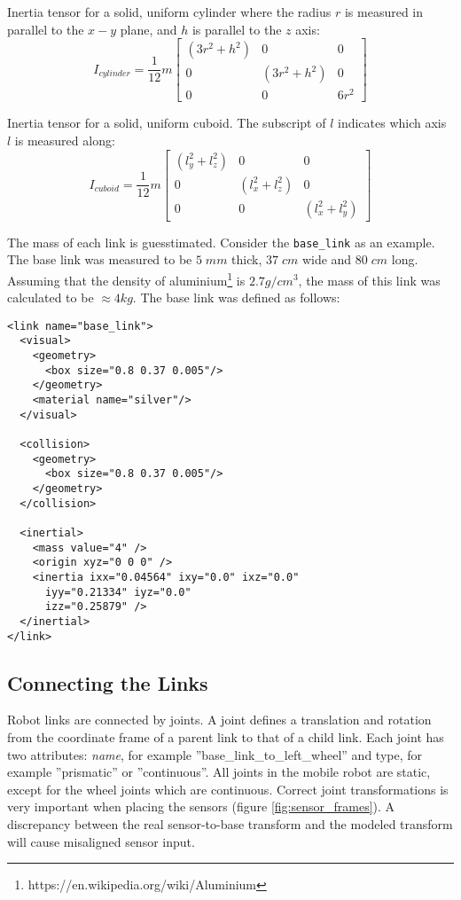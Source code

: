 Inertia tensor for a solid, uniform cylinder where the radius $r$ is measured in parallel to the $x - y$ plane, and $h$ is parallel to the $z$ axis:
\begin{equation}
I_{cylinder} = \frac{1}{12}m \begin{bmatrix}
	(3 r^2 + h^2) & 0 & 0 \\[0.3em]
	0 & (3 r^2 + h^2) & 0 \\[0.3em]
	0 & 0 & 6r^2
	\end{bmatrix}
	\label{eq:cylinder}
\end{equation}

Inertia tensor for a solid, uniform cuboid. The subscript of $l$ indicates which axis $l$ is measured along:
\begin{equation}
I_{cuboid} = \frac{1}{12}m \begin{bmatrix}
	(l_y^2 + l_z^2) & 0 & 0 \\[0.3em]
	0 & (l_x^2 + l_z^2) & 0 \\[0.3em]
	0 & 0 & (l_x^2 + l_y^2)
\end{bmatrix}
\label{eq:cuboid}
\end{equation}

The mass of each link is guesstimated. Consider the \texttt{base\_link} as an example. The base link was measured to be $5 \; mm$ thick, $37 \; cm$ wide and $80 \; cm$ long. Assuming that the density of aluminium\footnote{https://en.wikipedia.org/wiki/Aluminium} is $2.7 g/cm^3$, the mass of this link was calculated to be $\approx 4 kg$. The base link was defined as follows:

\lstset{language=XML}
\begin{lstlisting}
<link name="base_link">
  <visual>
    <geometry>
      <box size="0.8 0.37 0.005"/>
    </geometry>
    <material name="silver"/>
  </visual>
	  
  <collision>
    <geometry>
      <box size="0.8 0.37 0.005"/>
    </geometry>
  </collision>
	  
  <inertial>
    <mass value="4" />
    <origin xyz="0 0 0" />
    <inertia ixx="0.04564" ixy="0.0" ixz="0.0"
      iyy="0.21334" iyz="0.0" 
      izz="0.25879" />
  </inertial>
</link>
\end{lstlisting}

\subsection{Connecting the Links}

Robot links are connected by joints. A joint defines a translation and rotation from the coordinate frame of a parent link to that of a child link. Each joint has two attributes: \textit{name}, for example ''base\_link\_to\_left\_wheel'' and type, for example ''prismatic'' or ''continuous''. All joints in the mobile robot are static, except for the wheel joints which are continuous. Correct joint transformations is very important when placing the sensors (figure \ref{fig:sensor_frames}). A discrepancy between the real sensor-to-base transform and the modeled transform will cause misaligned sensor input.

